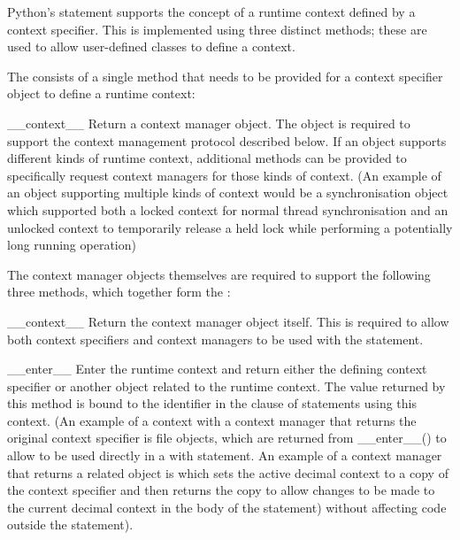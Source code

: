 
Python's  statement supports the concept of a runtime
context defined by a context specifier.  This is implemented using
three distinct methods; these are used to allow user-defined
classes to define a context.

The  consists of a single
method that needs to be provided for a context specifier object to
define a runtime context:

\begin{methoddesc}{__context__}{}
  Return a context manager object.  The object is required to support
  the context management protocol described below.  If an object
  supports different kinds of runtime context, additional methods can
  be provided to specifically request context managers for those
  kinds of context.  (An example of an object supporting multiple kinds
  of context would be a synchronisation object which supported both
  a locked context for normal thread synchronisation and an unlocked
  context to temporarily release a held lock while performing a
  potentially long running operation)
\end{methoddesc}

The context manager objects themselves are required to support the
following three methods, which together form the
:

\begin{methoddesc}{__context__}{}
  Return the context manager object itself.  This is required to
  allow both context specifiers and context managers to be used with
  the  statement.
\end{methoddesc}

\begin{methoddesc}{__enter__}{}
  Enter the runtime context and return either the defining context
  specifier or another object related to the runtime context. The value
  returned by this method is bound to the identifier in the
   clause of  statements using this context.
  (An example of a context with a context manager that returns the
  original context specifier is file objects, which are returned from
  __enter__() to allow  to be used directly in a with
  statement. An example of a context manager that returns a related
  object is  which sets the active decimal
  context to a copy of the context specifier and then returns the copy
  to allow changes to be made to the current decimal context in the
  body of the  statement) without affecting code outside
  the  statement).
\end{methoddesc}

